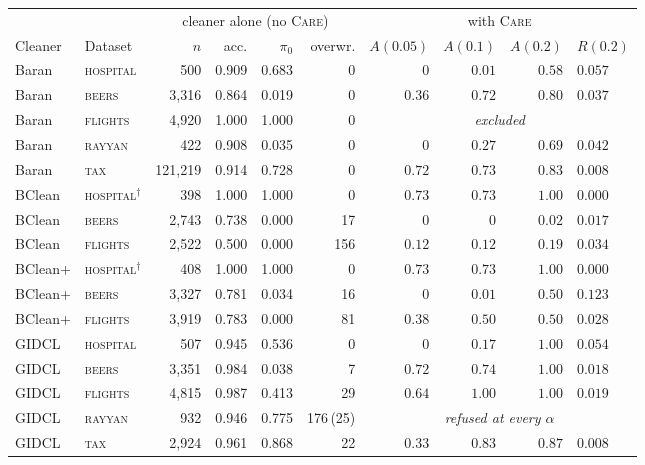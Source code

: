 \footnotesize
\setlength{\tabcolsep}{4.5pt}
\renewcommand{\arraystretch}{0.9}
\begin{tabular}{llrrrrrrrl}
\toprule
& & \multicolumn{4}{c}{cleaner alone (no \textsc{Care})} & \multicolumn{4}{c}{with \textsc{Care}} \\
\cmidrule(lr){3-6}\cmidrule(lr){7-10}
Cleaner & Dataset & $n$ & acc. & $\pi_0$ & overwr. & $A(0.05)$ & $A(0.1)$ & $A(0.2)$ & $R(0.2)$ \\
\midrule
Baran & \textsc{hospital} & 500 & 0.909 & 0.683 & 0 & $0$ & $0.01$ & $0.58$ & $0.057$ \\
Baran & \textsc{beers} & 3{,}316 & 0.864 & 0.019 & 0 & $0.36$ & $0.72$ & $0.80$ & $0.037$ \\
Baran & \textsc{flights} & 4{,}920 & 1.000 & 1.000 & 0 & \multicolumn{4}{c}{\emph{excluded}} \\
Baran & \textsc{rayyan} & 422 & 0.908 & 0.035 & 0 & $0$ & $0.27$ & $0.69$ & $0.042$ \\
Baran & \textsc{tax} & 121{,}219 & 0.914 & 0.728 & 0 & $0.72$ & $0.73$ & $0.83$ & $0.008$ \\
\addlinespace[1.5pt]
BClean & \textsc{hospital}$^{\dagger}$ & 398 & 1.000 & 1.000 & 0 & $0.73$ & $0.73$ & $1.00$ & $0.000$ \\
BClean & \textsc{beers} & 2{,}743 & 0.738 & 0.000 & 17 & $0$ & $0$ & $0.02$ & $0.017$ \\
BClean & \textsc{flights} & 2{,}522 & 0.500 & 0.000 & 156 & $0.12$ & $0.12$ & $0.19$ & $0.034$ \\
\addlinespace[1.5pt]
BClean+ & \textsc{hospital}$^{\dagger}$ & 408 & 1.000 & 1.000 & 0 & $0.73$ & $0.73$ & $1.00$ & $0.000$ \\
BClean+ & \textsc{beers} & 3{,}327 & 0.781 & 0.034 & 16 & $0$ & $0.01$ & $0.50$ & $0.123$ \\
BClean+ & \textsc{flights} & 3{,}919 & 0.783 & 0.000 & 81 & $0.38$ & $0.50$ & $0.50$ & $0.028$ \\
\addlinespace[1.5pt]
GIDCL & \textsc{hospital} & 507 & 0.945 & 0.536 & 0 & $0$ & $0.17$ & $1.00$ & $0.054$ \\
GIDCL & \textsc{beers} & 3{,}351 & 0.984 & 0.038 & 7 & $0.72$ & $0.74$ & $1.00$ & $0.018$ \\
GIDCL & \textsc{flights} & 4{,}815 & 0.987 & 0.413 & 29 & $0.64$ & $1.00$ & $1.00$ & $0.019$ \\
GIDCL & \textsc{rayyan} & 932 & 0.946 & 0.775 & 176\,(25) & \multicolumn{4}{c}{\emph{refused at every $\alpha$}} \\
GIDCL & \textsc{tax} & 2{,}924 & 0.961 & 0.868 & 22 & $0.33$ & $0.83$ & $0.87$ & $0.008$ \\

\end{tabular}
